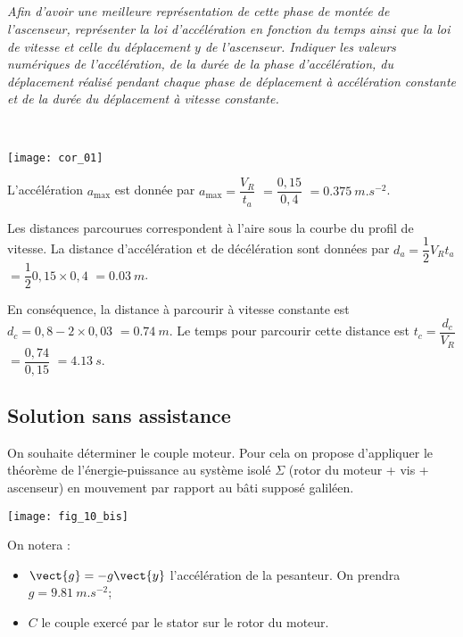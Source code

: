 \begin{multicols}{2}
\subparagraph{}\textit{Afin d’avoir une meilleure représentation de cette phase de montée de
l’ascenseur, représenter la loi d’accélération en fonction du temps ainsi que la loi
de vitesse et celle du déplacement $y$ de l’ascenseur. Indiquer les valeurs
numériques de l’accélération, de la durée de la phase d’accélération, du déplacement
réalisé pendant chaque phase de déplacement à accélération constante et de la durée du déplacement à vitesse constante.}
\ifprof
\begin{corrige}~\\

\begin{center}
\texttt{[image: cor\_01]}
\end{center}

L’accélération $a_{\text{max}}$ est donnée par $a_{\text{max}} = \dfrac{V_R}{t_a}$ $=\dfrac{0,15}{0,4}$ $=\SI{0,375}{m.s^{-2}}$. 

Les distances parcourues correspondent à l'aire sous la courbe du profil de vitesse. La distance d'accélération et de décélération sont données par $d_a=\dfrac{1}{2}V_R t_a$ $=\dfrac{1}{2}0,15\times 0,4$ $=\SI{0,03}{m}$.

En conséquence, la distance à parcourir à vitesse constante est $d_c=0,8-2\times 0,03$ $=\SI{0,74}{m}$. Le temps pour parcourir cette distance est $t_c=\dfrac{d_c}{V_R}$ $=\dfrac{0,74}{0,15}$ $=\SI{4,13}{s}$.
\end{corrige}
\else
\fi

\subsection*{Solution sans assistance}

On souhaite déterminer le couple moteur. Pour cela on propose d’appliquer le théorème de
l’énergie-puissance au système isolé $\Sigma$ (rotor du moteur + vis + ascenseur) en mouvement
par rapport au bâti supposé galiléen. 

\begin{center}
\texttt{[image: fig\_10\_bis]}
\end{center}

On notera :
\begin{itemize}
\item $\vect{g}=-g\vect{y}$ l’accélération de la pesanteur. On prendra $g=\SI{9,81}{m.s^{-2}}$;
\item $C$ le couple exercé par le stator sur le rotor du moteur.
\end{itemize}


\end{multicols}
